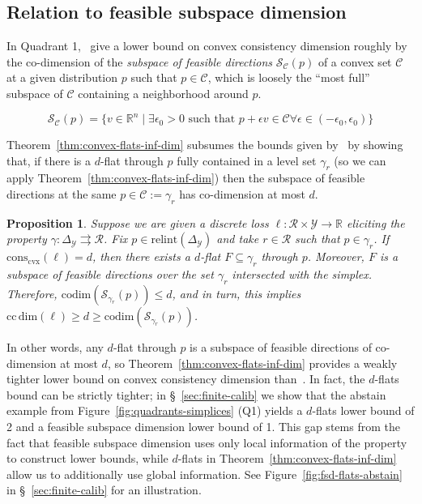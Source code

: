 \documentclass[11pt]{article} %
\newcommand{\reals}{\mathbb{R}}
\newcommand{\simplex}{\Delta_\Y}
\newcommand{\relint}[1]{\mathrm{relint}(#1)}
\newcommand{\conscvx}{\mathrm{cons}_\mathrm{cvx}}
\newcommand{\ccdim}{\mathrm{cc\,dim}}
\newcommand{\codim}{\mathrm{codim}}
\newcommand{\C}{\mathcal{C}}
\newcommand{\R}{\mathcal{R}}
\newcommand{\Sc}{\mathcal{S}}  %
\newcommand{\Y}{\mathcal{Y}}
\newcommand{\toto}{\rightrightarrows}
\newtheorem{proposition}{Proposition}
\begin{document}
\subsection{Relation to feasible subspace dimension}\label{sec:discrete-predictions-refactored}

In Quadrant 1,~\citet{ramaswamy2016convex} give a lower bound on convex consistency dimension roughly by the co-dimension of the \emph{subspace of feasible directions} $\Sc_{\C}(p)$ of a convex set $\C$ at a given distribution $p$ such that $p \in \C$, which is loosely the ``most full'' subspace of $\C$ containing a neighborhood around $p$.

\begin{equation*}\label{eq:feasible-subspace}
\Sc_\C(p) = \{v \in \reals^n \mid \exists \epsilon_0 > 0 \textrm{ such that } p + \epsilon v \in \C\forall \epsilon \in (-\epsilon_0, \epsilon_0) \}
\end{equation*}

Theorem~\ref{thm:convex-flats-inf-dim} subsumes the  bounds given by~\citet{ramaswamy2016convex} by showing that, if there is a $d$-flat through $p$ fully contained in a level set $\gamma_r$ (so we can apply Theorem~\ref{thm:convex-flats-inf-dim}) then the subspace of feasible directions at the same $p \in \C := \gamma_r$ has co-dimension at most $d$.

\begin{proposition}\label{prop:discrete-bound-subsumes-ramaswamy}
	Suppose we are given a discrete loss $\ell : \R \times \Y \to \reals$ eliciting the property $\gamma: \simplex \toto \R$.
	Fix $p \in \relint \simplex$ and take $r \in \R$ such that $p \in \gamma_r$.  
	If $\conscvx(\ell) = d$, then there exists a $d$-flat $F \subseteq \gamma_r$ through $p$.
	Moreover, $F$ is a subspace of feasible directions over the set $\gamma_r$ intersected with the simplex.
	Therefore, $\codim(\Sc_{\gamma_r}(p)) \leq d$, and in turn, this implies $\ccdim(\ell) \geq d \geq \codim(\Sc_{\gamma_r}(p))$.
\end{proposition}

In other words, any $d$-flat through $p$ is a subspace of feasible directions of co-dimension at most $d$, so Theorem~\ref{thm:convex-flats-inf-dim} provides a weakly tighter lower bound on convex consistency dimension than~\citet[Theorem 16]{ramaswamy2016convex}.
In fact, the $d$-flats bound can be strictly tighter; in \S~\ref{sec:finite-calib} we show that the abstain example from Figure~\ref{fig:quadrants-simplices} (Q1) yields a $d$-flats lower bound of 2 and a feasible subspace dimension lower bound of 1.
This gap stems from the fact that feasible subspace dimension uses only local information of the property to construct lower bounds, while $d$-flats in Theorem~\ref{thm:convex-flats-inf-dim} allow us to additionally use global information.
See Figure~\ref{fig:fsd-flats-abstain} in \S~\ref{sec:finite-calib} for an illustration.
\end{document}
